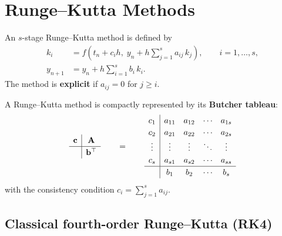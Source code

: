 \section{Runge--Kutta Methods}

\begin{definition}
\label{def:runge-kutta}
An $s$-stage Runge--Kutta method is defined by
\begin{align*}
    k_i &= f\!\left(t_n + c_i h,\; y_n + h\sum_{j=1}^{s} a_{ij}\,k_j\right), \qquad i = 1, \ldots, s, \\
    y_{n+1} &= y_n + h\sum_{i=1}^{s} b_i\,k_i.
\end{align*}
The method is \textbf{explicit} if $a_{ij} = 0$ for $j \geq i$.
\end{definition}

\begin{definition}
\label{def:butcher}
A Runge--Kutta method is compactly represented by its \textbf{Butcher tableau}:
\[
\renewcommand{\arraystretch}{1.2}
\begin{array}{c|c}
    \mathbf{c} & \mathbf{A} \\
    \hline
    & \mathbf{b}^\top
\end{array}
\qquad = \qquad
\begin{array}{c|cccc}
    c_1 & a_{11} & a_{12} & \cdots & a_{1s} \\
    c_2 & a_{21} & a_{22} & \cdots & a_{2s} \\
    \vdots & \vdots & \vdots & \ddots & \vdots \\
    c_s & a_{s1} & a_{s2} & \cdots & a_{ss} \\
    \hline
    & b_1 & b_2 & \cdots & b_s
\end{array}
\]
with the consistency condition $c_i = \sum_{j=1}^{s} a_{ij}$.
\end{definition}

\subsection{Classical fourth-order Runge--Kutta (RK4)}

